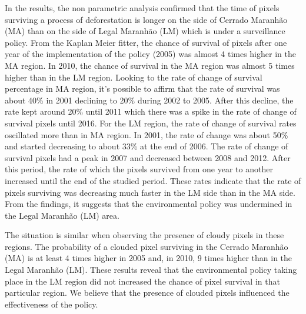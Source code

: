 
In the results, the non parametric analysis confirmed that the time of pixels surviving a process of deforestation is longer on the side of Cerrado Maranhão (MA) than on the side of Legal Maranhão (LM) which is under a surveillance policy. From the Kaplan Meier fitter, the chance of survival of pixels after one year of the implementation of the policy (2005) was almost 4 times higher in the MA region. In 2010, the chance of survival in the MA region was almost 5 times higher than in the LM region. Looking to the rate of change of survival percentage in MA region, it's possible to affirm that the rate of survival was about 40\% in 2001 declining to 20\% during 2002 to 2005. After this decline, the rate kept around 20\% until 2011 which there was a spike in the rate of change of survival pixels until 2016. For the LM region, the rate of change of survival rates oscillated more than in MA region. In 2001, the rate of change was about 50\% and started decreasing to about 33\% at the end of 2006. The rate of change of survival pixels had a peak in 2007 and decreased between 2008 and 2012. After this period, the rate of which the pixels survived from one year to another increased until the end of the studied period. These rates indicate that the rate of pixels surviving was decreasing much faster in the LM side than in the MA side. From the findings, it suggests that the environmental policy was undermined in the Legal Maranhão (LM) area. 

The situation is similar when observing the presence of cloudy pixels in these regions. The probability of a clouded pixel surviving in the Cerrado Maranhão (MA) is at least 4 times higher in 2005 and, in 2010, 9 times higher than in the Legal Maranhão (LM). These results reveal that the environmental policy taking place in the LM region did not increased the chance of pixel survival in that particular region. We believe that the presence of clouded pixels influenced the effectiveness of the policy. 


